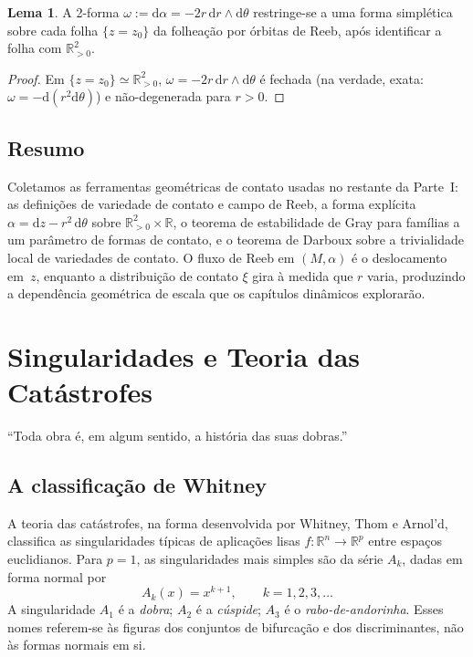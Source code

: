 \documentclass[12pt,a4paper,twoside]{book}
\theoremstyle{plain}
\theoremstyle{definition}
\newtheorem{lema}[teorema]{Lema}
\theoremstyle{definition}
\newcommand{\R}{\mathbb{R}}
\newcommand{\dd}{\mathrm{d}}
\begin{document}
\begin{lema}\label{lem:reeb-simplet}
A 2-forma $\omega := \dd\alpha = -2r\,\dd r \wedge \dd\theta$ restringe-se
a uma forma simplética sobre cada folha $\{z = z_{0}\}$ da folheação por
órbitas de Reeb, após identificar a folha com $\R^{2}_{>0}$.
\end{lema}

\begin{proof}
Em $\{z=z_{0}\} \simeq \R^{2}_{>0}$, $\omega = -2r\,\dd r \wedge \dd\theta$
é fechada (na verdade, exata: $\omega = -\dd(r^{2}\dd\theta)$) e
não-degenerada para $r > 0$.
\end{proof}

\section{Resumo}

Coletamos as ferramentas geométricas de contato usadas no restante da
Parte~I: as definições de variedade de contato e campo de Reeb, a forma
explícita $\alpha = \dd z - r^{2}\,\dd\theta$ sobre $\R^{2}_{>0}\times\R$,
o teorema de estabilidade de Gray para famílias a um parâmetro de formas
de contato, e o teorema de Darboux sobre a trivialidade local de variedades
de contato. O fluxo de Reeb em $(M,\alpha)$ é o deslocamento em~$z$,
enquanto a distribuição de contato $\xi$ gira à medida que $r$ varia,
produzindo a dependência geométrica de escala que os capítulos dinâmicos
explorarão.

\chapter{Singularidades e Teoria das Catástrofes}
\label{cap:singularidades}

\epigraph{``Toda obra é, em algum sentido, a história das suas dobras.''}{}

\section{A classificação de Whitney}

A teoria das catástrofes, na forma desenvolvida por Whitney, Thom e
Arnol'd, classifica as singularidades típicas de aplicações lisas
$f : \R^{n} \to \R^{p}$ entre espaços euclidianos. Para $p=1$, as
singularidades mais simples são da série $A_{k}$, dadas em forma normal por
\begin{equation}\label{eq:Ak-normal}
  A_{k}(x) = x^{k+1}, \qquad k = 1,2,3,\dots
\end{equation}
A singularidade $A_{1}$ é a \emph{dobra}; $A_{2}$ é a \emph{cúspide};
$A_{3}$ é o \emph{rabo-de-andorinha}. Esses nomes referem-se às figuras
dos conjuntos de bifurcação e dos discriminantes, não às formas normais
em si.
\end{document}
